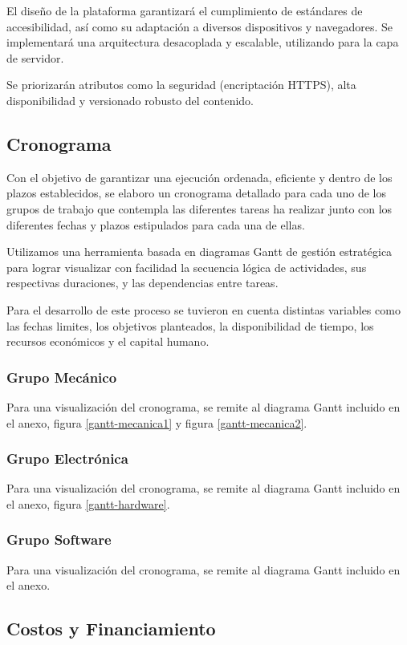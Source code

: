     El diseño de la plataforma garantizará el cumplimiento de estándares de accesibilidad, así como
    su adaptación a diversos dispositivos y navegadores. Se implementará una arquitectura desacoplada
    y escalable, utilizando para la capa de servidor.

    Se priorizarán atributos como la seguridad (encriptación HTTPS), alta disponibilidad y versionado
    robusto del contenido.


  \subsection{Cronograma}
    Con el objetivo de garantizar una ejecución ordenada, eficiente y dentro de los plazos
    establecidos, se elaboro un cronograma detallado para cada uno de los grupos de trabajo que
    contempla las diferentes tareas ha realizar junto con los diferentes fechas y plazos estipulados
    para cada una de ellas.

    Utilizamos una herramienta basada en diagramas Gantt de gestión estratégica para lograr
    visualizar con facilidad la secuencia lógica de actividades, sus respectivas duraciones, y las
    dependencias entre tareas.

    Para el desarrollo de este proceso se tuvieron en cuenta distintas variables como las fechas
    limites, los objetivos planteados, la disponibilidad de tiempo, los recursos económicos y el
    capital humano.

    \subsubsection{Grupo Mecánico}
    Para una visualización del cronograma, se remite al diagrama Gantt incluido en el anexo, figura
    \ref{gantt-mecanica1} y figura \ref{gantt-mecanica2}.
    \subsubsection{Grupo Electrónica}
    Para una visualización del cronograma, se remite al diagrama Gantt incluido en el anexo, figura
    \ref{gantt-hardware}.
    \subsubsection{Grupo Software}
    Para una visualización del cronograma, se remite al diagrama Gantt incluido en el anexo.
  \subsection{Costos y Financiamiento}

